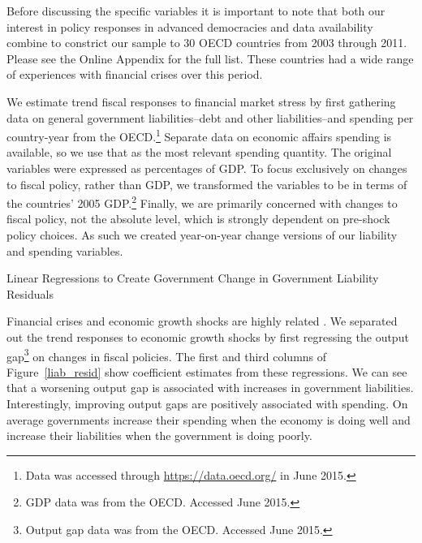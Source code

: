 \documentclass[]{article}
\begin{document}
Before discussing the specific variables it is important to note that both our interest in policy responses in advanced democracies and data availability combine to constrict our sample to 30 OECD countries from 2003 through 2011. Please see the Online Appendix for the full list. These countries had a wide range of experiences with financial crises over this period.

We estimate trend fiscal responses to financial market stress by first gathering data on general government liabilities--debt and other liabilities--and spending per country-year from the OECD.\footnote{Data was accessed through \url{https://data.oecd.org/} in June 2015.} Separate data on economic affairs spending is available, so we use that as the most relevant spending quantity. The original variables were expressed as percentages of GDP. To focus exclusively on changes to fiscal policy, rather than GDP, we transformed the variables to be in terms of the countries' 2005 GDP.\footnote{GDP data was from the OECD. Accessed June 2015.} Finally, we are primarily concerned with changes to fiscal policy, not the absolute level, which is strongly dependent on pre-shock policy choices. As such we created year-on-year change versions of our liability and spending variables.

\begin{table}
    \caption{Linear Regressions to Create Government Change in Government Liability Residuals}
    \label{liab_resid}

    \begin{center}
        
    \end{center}

\end{table}

Financial crises and economic growth shocks are highly related \cite[see][]{Reinhart2009}. We separated out the trend responses to economic growth shocks by first regressing the output gap\footnote{Output gap data was from the OECD. Accessed June 2015.} on changes in fiscal policies. The first and third columns of Figure~\ref{liab_resid} show coefficient estimates from these regressions. We can see that a worsening output gap is associated with increases in government liabilities. Interestingly, improving output gaps are positively associated with spending. On average governments increase their spending when the economy is doing well and increase their liabilities when the government is doing poorly.
\end{document}
